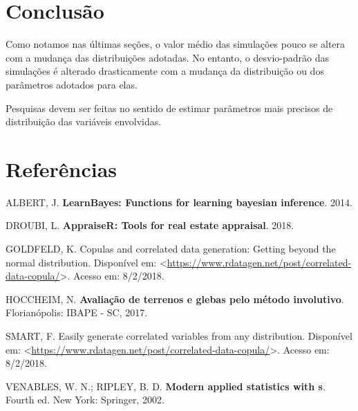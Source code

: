 \documentclass[a4paper]{article}
\begin{document}

\section{Conclusão}\label{conclusao}

Como notamos nas últimas seções, o valor médio das simulações pouco se
altera com a mudança das distribuições adotadas. No entanto, o
desvio-padrão das simulações é alterado drasticamente com a mudança da
distribuição ou dos parâmetros adotados para elas.

Pesquisas devem ser feitas no sentido de estimar parâmetros mais
precisos de distribuição das variáveis envolvidas.

\section*{Referências}\label{referencias}

\hypertarget{refs}{}
\hypertarget{ref-LearnBayes}{}
ALBERT, J. \textbf{LearnBayes: Functions for learning bayesian
inference}. 2014.

\hypertarget{ref-appraiseR}{}
DROUBI, L. \textbf{AppraiseR: Tools for real estate appraisal}. 2018.

\hypertarget{ref-Copulas}{}
GOLDFELD, K. Copulas and correlated data generation: Getting beyond the
normal distribution. Disponível em:
\textless{}\url{https://www.rdatagen.net/post/correlated-data-copula/}\textgreater{}.
Acesso em: 8/2/2018.

\hypertarget{ref-hoccheim2}{}
HOCCHEIM, N. \textbf{Avaliação de terrenos e glebas pelo método
involutivo}. Florianópolis: IBAPE - SC, 2017.

\hypertarget{ref-econometrics}{}
SMART, F. Easily generate correlated variables from any distribution.
Disponível em:
\textless{}\url{https://www.rdatagen.net/post/correlated-data-copula/}\textgreater{}.
Acesso em: 8/2/2018.

\hypertarget{ref-MASS}{}
VENABLES, W. N.; RIPLEY, B. D. \textbf{Modern applied statistics with
s}. Fourth ed. New York: Springer, 2002.
\end{document}
